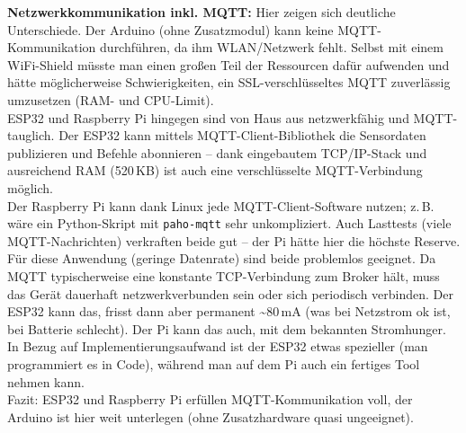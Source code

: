 \noindent\textbf{Netzwerkkommunikation inkl. MQTT:} Hier zeigen sich deutliche Unterschiede. Der Arduino (ohne Zusatzmodul) kann keine MQTT-Kommunikation durchführen, da ihm WLAN/Netzwerk fehlt. Selbst mit einem WiFi-Shield müsste man einen großen Teil der Ressourcen dafür aufwenden und hätte möglicherweise Schwierigkeiten, ein SSL-verschlüsseltes MQTT zuverlässig umzusetzen (RAM- und CPU-Limit).\autocite{atmega_datasheet}
\\
ESP32 und Raspberry Pi hingegen sind von Haus aus netzwerkfähig und MQTT-tauglich. Der ESP32 kann mittels MQTT-Client-Bibliothek die Sensordaten publizieren und Befehle abonnieren – dank eingebautem TCP/IP-Stack und ausreichend RAM (520\,KB) ist auch eine verschlüsselte MQTT-Verbindung möglich. \autocite{esp_datasheet}
\\
Der Raspberry Pi kann dank Linux jede MQTT-Client-Software nutzen; z.\,B. wäre ein Python-Skript mit \texttt{paho-mqtt} sehr unkompliziert. Auch Lasttests (viele MQTT-Nachrichten) verkraften beide gut – der Pi hätte hier die höchste Reserve. 
\autocite{raspberry_pi_datasheet}
\\
Für diese Anwendung (geringe Datenrate) sind beide problemlos geeignet. Da MQTT typischerweise eine konstante TCP-Verbindung zum Broker hält, muss das Gerät dauerhaft netzwerkverbunden sein oder sich periodisch verbinden. Der ESP32 kann das, frisst dann aber permanent \textasciitilde80\,mA (was bei Netzstrom ok ist, bei Batterie schlecht). Der Pi kann das auch, mit dem bekannten Stromhunger. In Bezug auf Implementierungsaufwand ist der ESP32 etwas spezieller (man programmiert es in Code), während man auf dem Pi auch ein fertiges Tool nehmen kann. 
\\
Fazit: ESP32 und Raspberry Pi erfüllen MQTT-Kommunikation voll, der Arduino ist hier weit unterlegen (ohne Zusatzhardware quasi ungeeignet).


\vspace{5mm}

